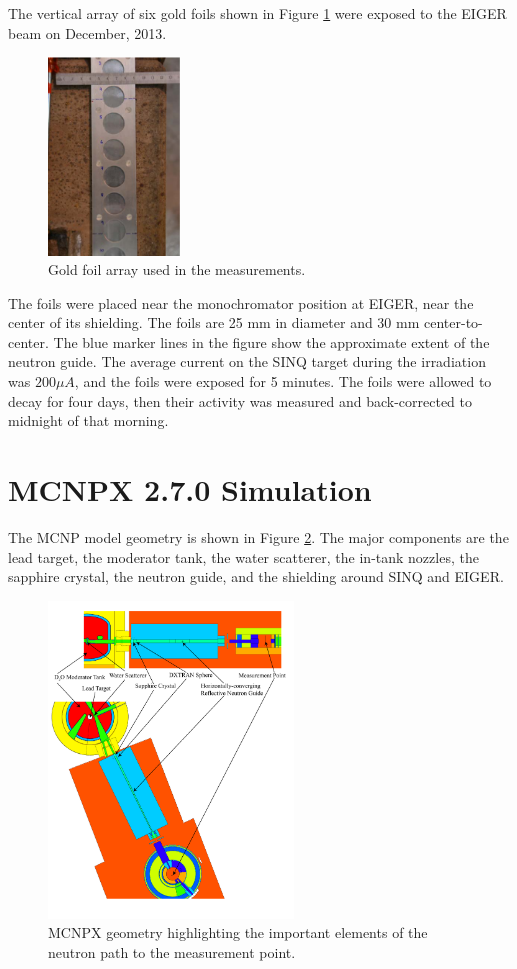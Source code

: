 \documentclass[a4paper,
              ]{jacow}
\begin{document}
The vertical array of six gold foils shown in Figure \ref{foils} were exposed to the EIGER beam on December, 2013.   

\begin{figure}[!htb]
   \centering
   \includegraphics*[width=35mm]{graphics/foils.eps}
   \caption{Gold foil array used in the measurements.}
   \label{foils}
\end{figure}

The foils were placed near the monochromator position at EIGER, near the center of its shielding.  The foils are 25 mm in diameter and 30 mm center-to-center.  The blue marker lines in the figure show the approximate extent of the neutron guide.  The average current on the SINQ target during the irradiation was $200 \mu A$, and the foils were exposed for 5 minutes.  The foils were allowed to decay for four days, then their activity was measured and back-corrected to midnight of that morning.


\section{MCNPX 2.7.0 Simulation}

The MCNP model geometry is shown in Figure \ref{geom}.  The major components are the lead target, the moderator tank, the water scatterer, the in-tank nozzles, the sapphire crystal, the neutron guide, and the shielding around SINQ and EIGER.

\begin{figure}[!htb]
   \centering
   \includegraphics*[trim = 0mm 25mm 0mm 10mm, width=65mm]{graphics/geom.pdf}
   \caption{MCNPX geometry highlighting the important elements of the neutron path to the measurement point.}
   \label{geom}
\end{figure}
\end{document}
